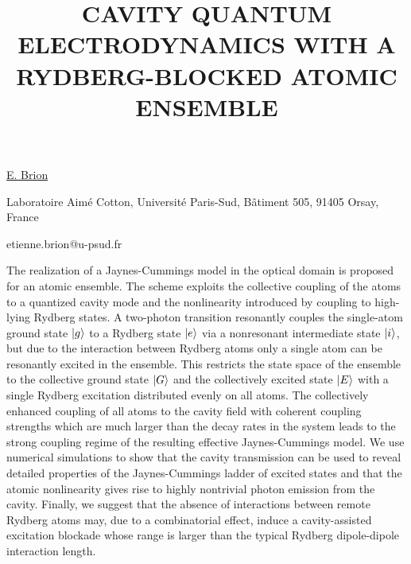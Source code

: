 \title{CAVITY QUANTUM ELECTRODYNAMICS WITH A RYDBERG-BLOCKED ATOMIC ENSEMBLE}

\underline{E. Brion} 

{\normalsize{\vspace{-4mm}
Laboratoire Aim\'e Cotton, Universit\'e Paris-Sud, B\^atiment 505, 91405 Orsay, France

\email etienne.brion@u-psud.fr}}

The realization of a Jaynes-Cummings model in the optical domain is proposed for an atomic ensemble. The scheme exploits the collective coupling of the atoms to a quantized cavity mode and the nonlinearity introduced by coupling to high-lying Rydberg states. A two-photon transition resonantly couples the single-atom ground state $\left|g\right\rangle$ to a Rydberg state $\left|e\right\rangle$ via a nonresonant intermediate state $\left|i\right\rangle$, but due to the interaction between Rydberg atoms only a single atom can be resonantly excited in the ensemble. This restricts the state space of the ensemble to the collective ground state $\left|G\right\rangle$ and the collectively excited state $\left|E\right\rangle$ with a single Rydberg excitation distributed evenly on all atoms. The collectively enhanced coupling of all atoms to the cavity field with coherent coupling strengths which are much larger than the decay rates in the system leads to the strong coupling regime of the resulting effective Jaynes-Cummings model. We use numerical simulations to show that the cavity transmission can be used to reveal detailed properties of the Jaynes-Cummings ladder of excited states and that the atomic nonlinearity gives rise to highly nontrivial photon emission from the cavity. Finally, we suggest that the absence of interactions between remote Rydberg atoms may, due to a combinatorial effect, induce a cavity-assisted excitation blockade whose range is larger than the typical Rydberg dipole-dipole interaction length.

\vspace{\baselineskip} 